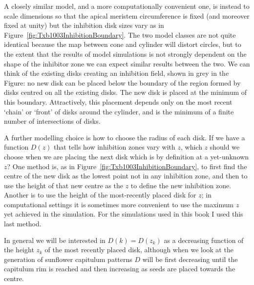 A closely similar model, and a more computationally convenient one, is instead to scale dimensions so that the apical meristem circumference is fixed (and moreover fixed at unity) but the inhibition disk sizes vary as in Figure~\ref{fig:Txb1003InhibitionBoundary}. The two model classes are not quite identical because the map between cone and cylinder will distort circles, but to the extent that the results of model simulations is not strongly dependent on the shape of the inhibitor zone we can expect similar results between the two.
 We can 
think of the existing disks creating an inhibition field, shown in grey in the Figure: no new disk can be placed below the boundary of the region formed by disks centred on all the existing disks. The new disk is placed at the minimum of this boundary.  Attractively, this placement depends only on the most recent `chain' or `front' of disks around the cylinder, and is the minimum of a finite number of intersections of disks. 

\clearpage
{}

A further modelling choice is how to choose the radius of each disk. If we have a function $D(z)$ that tells how inhibition zones vary with $z$, which $z$ should we choose when we are placing the next disk which is by definition at a yet-unknown $z$?  One method is, as in Figure~\ref{fig:Txb1003InhibitionBoundary}, to first find the centre of the new disk as the lowest point not in any inhibition zone, and then to use the height of that new centre as the $z$ to define the new inhibition zone. Another is to use the height of the most-recently placed disk for $z$; in computational settings it is sometimes more convenient to use the maximum $z$ yet achieved in the simulation. For the simulations used in this book I used this last method.

In general we will be interested in $D(k)=D(z_k)$ as a decreasing function of the height $z_k$ of the most recently placed disk, although when we look at the generation of sunflower capitulum patterns $D$ will be first decreasing until the capitulum rim is reached and then increasing as seeds are placed towards the centre. 

